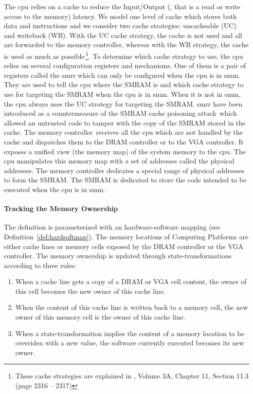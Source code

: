 The \ac{cpu} relies on a cache to reduce the Input/Output (\IO, that is a read
or write access to the memory) latency.
%
We model one level of cache which stores both data and instructions and we
consider two cache strategies: uncacheable (UC) and writeback (WB).
%
With the UC cache strategy, the cache is not used and all \IOs are forwarded to
the memory controller, whereas with the WB strategy, the cache is used as much
as possible\,\footnote{These cache strategies are explained in
  \cite{intel2014manual}, Volume 3A, Chapter 11, Section 11.3 (page 2316 --
  2317)}.
%
To determine which cache strategy to use, the \ac{cpu} relies on several
configuration registers and mechanisms.
%
One of them is a pair of registers called the \ac{smrr} which can only be
configured when the \ac{cpu} is in \ac{smm}.
%
They are used to tell the \ac{cpu} where the SMRAM is and which cache strategy
to use for \IO targeting the SMRAM when the \ac{cpu} is in \ac{smm}.  When it is
not in \ac{smm}, the \ac{cpu} always uses the UC strategy for \IO targeting the
SMRAM.
%
\ac{smrr} have been introduced as a countermeasure of the SMRAM cache poisoning
attack\,\cite{wojtczuk2009smram,duflot2009smram} which allowed an untrusted code
to tamper with the copy of the SMRAM stored in the cache.
%
The memory controller\,\cite{intel2009mch} receives all the \ac{cpu} \IOs which
are not handled by the cache and dispatches them to the DRAM controller or to
the VGA controller. It exposes a unified view (the memory map) of the system
memory to the \ac{cpu}.
%
The \ac{cpu} manipulates this memory map with a set of addresses called the
physical addresses.
%
The memory controller dedicates a special range of physical addresses to form
the SMRAM.
%
The SMRAM is dedicated to store the code intended to be executed when the
\ac{cpu} is in \ac{smm}.

\paragraph{Tracking the Memory Ownership}
%
The  definition is parameterized with an hardware-software
mapping (see Definition~\ref{def:hardsoftmap}).
%
The memory locations of  Computing Platforms are either cache
lines or memory cells exposed by the DRAM controller or the VGA controller.
%
The memory ownership is updated through state-transformations according to three
rules:
%
\begin{enumerate}
\item When a cache line gets a copy of a DRAM or VGA cell content, the owner of
  this cell becomes the new owner of this cache line.
%
\item When the content of this cache line is written back to a memory cell, the
  new owner of this memory cell is the owner of this cache line.
%
\item When a state-transformation implies the content of a memory location to be
  overriden with a new value, the software currently executed becomes its new
  owner.
%
\end{enumerate}

